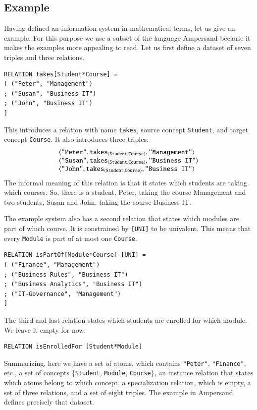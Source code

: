 \documentclass{elsarticle}
\begin{document}
\subsection{Example}
\label{As-is IS}
   Having defined an information system in mathematical terms, let us give an example.
   For this purpose we use a subset of the language Ampersand
   because it makes the examples more appealing to read.
   Let us first define a dataset of seven triples and three relations.
\begin{verbatim}
RELATION takes[Student*Course] =
[ ("Peter", "Management")
; ("Susan", "Business IT")
; ("John", "Business IT")
]
\end{verbatim}
   This introduces a relation with name \verb#takes#,
   source concept \verb#Student#, and
   target concept \verb#Course#.
   It also introduces three triples:
\[\begin{array}{l}
   \langle{\text{\tt "Peter"}},{\text{\it \text{\tt takes}\/}_{\langle{\text{\tt Student}},{\text{\tt Course}}\rangle}},{\text{\tt "Management"}}\rangle\\
   \langle{\text{\tt "Susan"}},{\text{\it \text{\tt takes}\/}_{\langle{\text{\tt Student}},{\text{\tt Course}}\rangle}},{\text{\tt "Business IT"}}\rangle\\
   \langle{\text{\tt "John"}},{\text{\it \text{\tt takes}\/}_{\langle{\text{\tt Student}},{\text{\tt Course}}\rangle}},{\text{\tt "Business IT"}}\rangle\\
\end{array}\]
   The informal meaning of this relation is that it states which students are taking which courses.
   So, there is a student, Peter, taking the course Management and two students, Susan and John, taking the course Business IT.

   The example system also has a second relation that states which modules are part of which course.
   It is constrained by \verb-[UNI]- to be univalent.
   This means that every \verb-Module- is part of at most one \verb-Course-.
\begin{verbatim}
RELATION isPartOf[Module*Course] [UNI] =
[ ("Finance", "Management")
; ("Business Rules", "Business IT")
; ("Business Analytics", "Business IT")
; ("IT-Governance", "Management")
]
\end{verbatim}
   The third and last relation states which students are enrolled for which module.
   We leave it empty for now.
\begin{verbatim}
RELATION isEnrolledFor [Student*Module]
\end{verbatim}
   Summarizing, here we have a set of atoms, which contains \verb-"Peter"-, \verb-"Finance"-, etc.,
   a set of concepts $\{$\verb-Student-, \verb-Module-, \verb-Course-$\}$,
   an instance relation that states which atoms belong to which concept,
   a specialization relation, which is empty,
   a set of three relations, and
   a set of eight triples.
   The example in Ampersand defines precisely that dataset.
   
\end{document}
